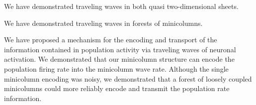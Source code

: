 We have demonstrated traveling waves in both quasi two-dimensional sheets.

We have demonstrated traveling waves in forests of minicolumns.

We have proposed a mechanism for the encoding and transport of the information contained in population activity via traveling waves of neuronal activation.
We demonstrated that our minicolumn structure can encode the population firing rate into the minicolumn wave rate.
Although the single minicolumn encoding was noisy, we demonstrated that a forest of loosely coupled  minicolumns could more reliably encode and transmit the population rate information.

\endinput
